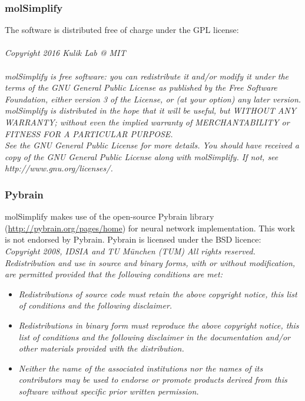 \subsubsection{molSimplify}
The software is distributed free of charge under the GPL license: \\  \\
\textit{Copyright 2016 Kulik Lab @ MIT\\ \\
    molSimplify is free software: you can redistribute it and/or modify it under the terms of the GNU General Public License as published by the Free Software Foundation, either version 3 of the License, or (at your option) any later version. molSimplify is distributed in the hope that it will be useful,  but WITHOUT ANY WARRANTY; without even the implied warranty of MERCHANTABILITY or FITNESS FOR A PARTICULAR PURPOSE.\\    See the GNU General Public License for more details.     You should have received a copy of the GNU General Public License 
    along with molSimplify. If not, see http://www.gnu.org/licenses/.
}
\subsubsection{Pybrain}
molSimplify makes use of the open-source Pybrain library (\url{http://pybrain.org/pages/home}) for neural network implementation. This work is not endorsed by Pybrain. Pybrain is licensed under the BSD licence:\\

\textit{Copyright 2008, IDSIA and TU M\"{u}nchen (TUM)
All rights reserved.}
\\
\textit{Redistribution and use in source and binary forms, with or without
modification, are permitted provided that the following conditions are met:}
\begin{itemize}
   \item \textit{Redistributions of source code must retain the above copyright
      notice, this list of conditions and the following disclaimer.}
    \item \textit{Redistributions in binary form must reproduce the above copyright
      notice, this list of conditions and the following disclaimer in the
      documentation and/or other materials provided with the distribution.}
    \item \textit{Neither the name of the associated institutions nor the
      names of its contributors may be used to endorse or promote products
      derived from this software without specific prior written permission.}
\end{itemize}

